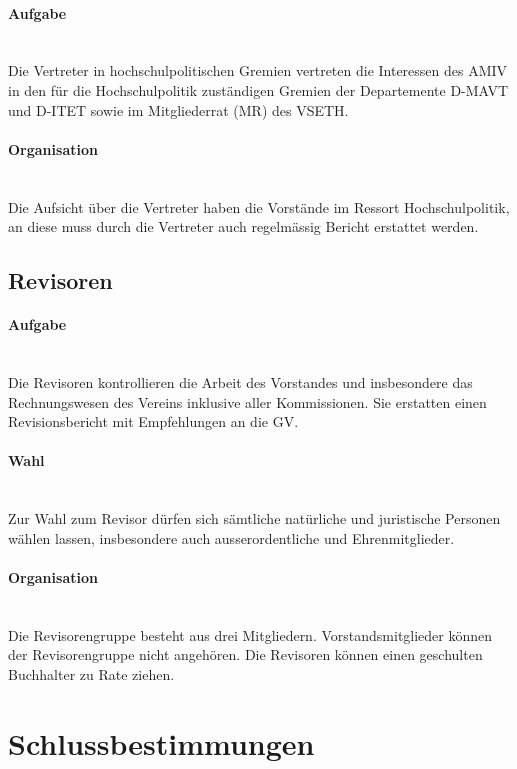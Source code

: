 \documentclass[a4paper,11pt]{article}
\begin{document}
\paragraph{Aufgabe} \ \\
Die Vertreter in hochschulpolitischen Gremien vertreten die Interessen des AMIV in den für die Hochschulpolitik zuständigen Gremien der Departemente D-MAVT und D-ITET sowie im Mitgliederrat (MR) des VSETH.


\paragraph{Organisation} \ \\
Die Aufsicht über die Vertreter haben die Vorstände im Ressort Hochschulpolitik, an diese muss durch die Vertreter auch regelmässig Bericht erstattet werden.


\subsection{Revisoren}
\paragraph{Aufgabe} \ \\
Die Revisoren kontrollieren die Arbeit des Vorstandes und insbesondere das Rechnungswesen des Vereins inklusive aller Kommissionen. Sie erstatten einen Revisionsbericht mit Empfehlungen an die GV.

\paragraph{Wahl} \ \\
Zur Wahl zum Revisor dürfen sich sämtliche natürliche und juristische Personen wählen lassen, insbesondere auch ausserordentliche und Ehrenmitglieder.

\paragraph{Organisation} \ \\
Die Revisorengruppe besteht aus drei Mitgliedern. Vorstandsmitglieder können der Revisorengruppe nicht angehören. Die Revisoren können einen geschulten Buchhalter zu Rate ziehen.


\section{Schlussbestimmungen}
\end{document}
